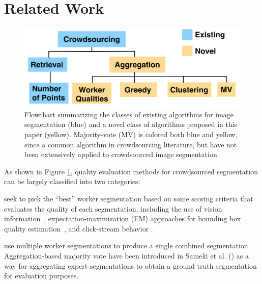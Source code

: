 \section{Related Work\label{sec:related}}
\begin{figure}[h!]
\centering
\includegraphics[width=\linewidth]{plots/flowchart.png}
\caption{Flowchart summarizing the classes of existing algorithms for image segmentation (blue) and a novel class of algorithms proposed in this paper (yellow). Majority-vote (MV) is colored both blue and yellow, since a common algorithm in crowdsourcing literature, but have not been extensively applied to crowdsourced image segmentation.}
\vspace{-10pt}
\label{flowchart}
\end{figure}
As shown in Figure \ref{flowchart}, quality evaluation methods for crowdsourced segmentation can be largely classified into two categories:

 seek to pick the ``best'' worker segmentation based on some scoring criteria that evaluates the quality of each segmentation, including the use of vision information~\cite{Vittayakorn2011,Russakovsky2015}, expectation-maximization (EM) approaches for bounding box quality estimation~\cite{MDWWelinder2010}, and click-stream behavior \cite{Cabezas2015,Sameki2015,Sorokin2008}.

 use multiple worker segmentations to produce a single combined segmentation. %
Aggregation-based majority vote have been introduced in Sameki et al. (\citeyear{Sameki2015}) as a way for aggregating expert segmentations to obtain a ground truth segmentation for evaluation purposes. 

